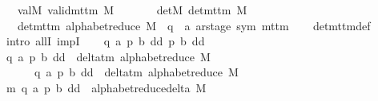 \begin{isabellebody}
\ \ \ valM{\isacharcolon}{\kern0pt}\ {\isachardoublequoteopen}valid{\isacharunderscore}{\kern0pt}mttm\ M{\isachardoublequoteclose}\isanewline
\ \ \ \ \ \ \ detM{\isacharcolon}{\kern0pt}\ {\isachardoublequoteopen}det{\isacharunderscore}{\kern0pt}mttm\ M{\isachardoublequoteclose}\isanewline
\ \ \ {\isachardoublequoteopen}det{\isacharunderscore}{\kern0pt}mttm\ {\isacharparenleft}{\kern0pt}alphabet{\isacharunderscore}{\kern0pt}reduce\ M\ {\isacharcolon}{\kern0pt}{\isacharcolon}{\kern0pt}\ {\isacharparenleft}{\kern0pt}{\isacharprime}{\kern0pt}q\ {\isasymtimes}\ {\isacharprime}{\kern0pt}a\ ar{\isacharunderscore}{\kern0pt}stage{\isacharcomma}{\kern0pt}\ sym{}{\isacharparenright}{\kern0pt}\ mttm{\isacharparenright}{\kern0pt}{\isachardoublequoteclose}\isanewline
%
\isadelimproof
\ \ %
\endisadelimproof
%
\isatagproof
{}\isamarkupfalse%
\ det{\isacharunderscore}{\kern0pt}mttm{\isacharunderscore}{\kern0pt}def\isanewline
{}\isamarkupfalse%
\ {\isacharparenleft}{\kern0pt}intro\ allI\ impI{\isacharparenright}{\kern0pt}\isanewline
\ \ \isamarkupfalse%
\ q\ a\ p{}\ b{}\ dd{}\ p{}\ b{}\ dd{}\isanewline
\ \ \isamarkupfalse%
\ {\isachardoublequoteopen}{\isacharparenleft}{\kern0pt}q{\isacharcomma}{\kern0pt}\ a{\isacharcomma}{\kern0pt}\ p{}{\isacharcomma}{\kern0pt}\ b{}{\isacharcomma}{\kern0pt}\ dd{}{\isacharparenright}{\kern0pt}\ {\isasymin}\ delta{\isacharunderscore}{\kern0pt}tm\ {\isacharparenleft}{\kern0pt}alphabet{\isacharunderscore}{\kern0pt}reduce\ M{\isacharparenright}{\kern0pt}{\isachardoublequoteclose}\isanewline
\ \ \ \ \ \ {\isachardoublequoteopen}{\isacharparenleft}{\kern0pt}q{\isacharcomma}{\kern0pt}\ a{\isacharcomma}{\kern0pt}\ p{}{\isacharcomma}{\kern0pt}\ b{}{\isacharcomma}{\kern0pt}\ dd{}{\isacharparenright}{\kern0pt}\ {\isasymin}\ delta{\isacharunderscore}{\kern0pt}tm\ {\isacharparenleft}{\kern0pt}alphabet{\isacharunderscore}{\kern0pt}reduce\ M{\isacharparenright}{\kern0pt}{\isachardoublequoteclose}\isanewline
\ \ \isamarkupfalse%
\ m{}{\isacharcolon}{\kern0pt}\ {\isachardoublequoteopen}{\isacharparenleft}{\kern0pt}q{\isacharcomma}{\kern0pt}\ a{\isacharcomma}{\kern0pt}\ p{}{\isacharcomma}{\kern0pt}\ b{}{\isacharcomma}{\kern0pt}\ dd{}{\isacharparenright}{\kern0pt}\ {\isasymin}\ alphabet{\isacharunderscore}{\kern0pt}reduce{\isacharunderscore}{\kern0pt}delta\ M{\isachardoublequoteclose}\isanewline

\end{isabellebody}
